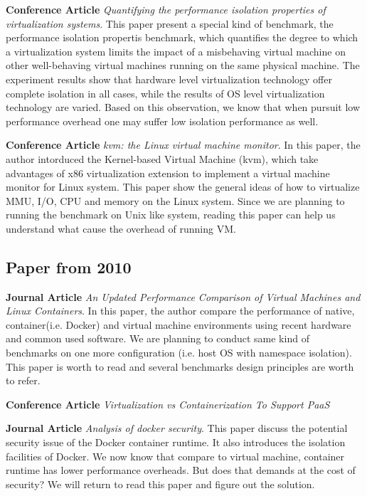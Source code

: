 \documentclass{article}
\begin{document}
\medskip

\textbf{Conference Article} \emph{Quantifying the performance isolation properties of virtualization 
systems}\cite{matthews2007quantifying}. This paper present a special kind of benchmark, the 
performance isolation propertis benchmark, which quantifies the degree to which a virtualization
system limits the impact of a misbehaving virtual machine on other well-behaving virtual machines
running on the same physical machine. The experiment results show that hardware level virtualization
technology offer complete isolation in all cases, while the results of OS level virtualization 
technology are varied. Based on this observation, we know that when pursuit low performance overhead 
one may suffer low isolation performance as well. 

\medskip

\textbf{Conference Article} \emph{kvm: the Linux virtual machine monitor}\cite{kivity2007kvm}. 
In this paper, the author intorduced the Kernel-based Virtual Machine (kvm), which take advantages of
x86 virtualization extension to implement a virtual machine monitor for Linux system. This 
paper show the general ideas of how to virtualize MMU, I/O, CPU and memory on the Linux system.
Since we are planning to running the benchmark on Unix like system, reading this paper can help us 
understand what cause the overhead of running VM.

\subsection{Paper from 2010}

\textbf{Journal Article} \emph{An Updated Performance Comparison of Virtual Machines and Linux 
Containers}\cite{felter2014updated}. In this paper, the author compare the performance of 
native, container(i.e. Docker) and virtual machine environments using recent hardware and common 
used software. We are planning to conduct same kind of benchmarks on one more configuration
(i.e. host OS with namespace isolation). This paper is worth to read and several benchmarks 
design principles are worth to refer.

\medskip

\textbf{Conference Article} \emph{Virtualization vs Containerization To Support PaaS}
\cite{dua2014virtualization}

\medskip

\textbf{Journal Article} \emph{Analysis of docker security}\cite{bui2015analysis}. This paper 
discuss the potential security issue of the Docker container runtime. It also introduces the 
isolation facilities of Docker. We now know that compare to virtual machine, container runtime 
has lower performance overheads. But does that demands at the cost of security? We will return to
read this paper and figure out the solution. 
\end{document}
